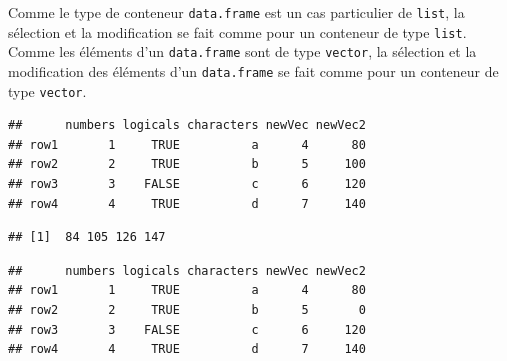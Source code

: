 \documentclass[]{book}
\newenvironment{Shaded}{\begin{snugshade}}{\end{snugshade}}
\newcommand{\DecValTok}[1]{\textcolor[rgb]{0.00,0.00,0.81}{#1}}
\newcommand{\KeywordTok}[1]{\textcolor[rgb]{0.13,0.29,0.53}{\textbf{#1}}}
\newcommand{\NormalTok}[1]{#1}
\newcommand{\OperatorTok}[1]{\textcolor[rgb]{0.81,0.36,0.00}{\textbf{#1}}}
\newcommand{\StringTok}[1]{\textcolor[rgb]{0.31,0.60,0.02}{#1}}
\begin{document}
Comme le type de conteneur \texttt{data.frame} est un cas particulier de \texttt{list}, la sélection et la modification se fait comme pour un conteneur de type \texttt{list}. Comme les éléments d'un \texttt{data.frame} sont de type \texttt{vector}, la sélection et la modification des éléments d'un \texttt{data.frame} se fait comme pour un conteneur de type \texttt{vector}.

\begin{Shaded}
\end{Shaded}

\begin{verbatim}
##      numbers logicals characters newVec newVec2
## row1       1     TRUE          a      4      80
## row2       2     TRUE          b      5     100
## row3       3    FALSE          c      6     120
## row4       4     TRUE          d      7     140
\end{verbatim}

\begin{Shaded}
\end{Shaded}

\begin{verbatim}
## [1]  84 105 126 147
\end{verbatim}

\begin{Shaded}
\end{Shaded}

\begin{verbatim}
##      numbers logicals characters newVec newVec2
## row1       1     TRUE          a      4      80
## row2       2     TRUE          b      5       0
## row3       3    FALSE          c      6     120
## row4       4     TRUE          d      7     140
\end{verbatim}
\end{document}
